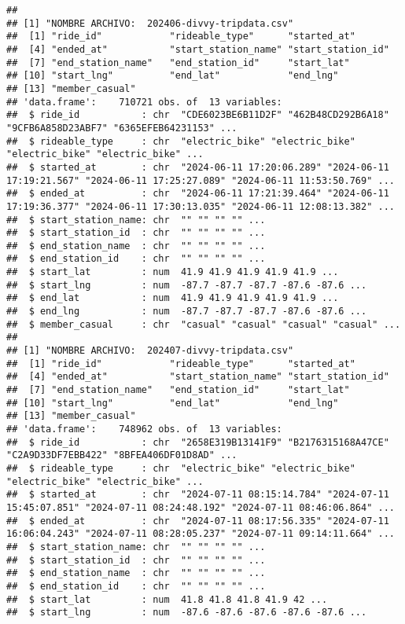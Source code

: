 \documentclass[
]{article}
\begin{document}
\begin{verbatim}
## 
## [1] "NOMBRE ARCHIVO:  202406-divvy-tripdata.csv"
##  [1] "ride_id"            "rideable_type"      "started_at"        
##  [4] "ended_at"           "start_station_name" "start_station_id"  
##  [7] "end_station_name"   "end_station_id"     "start_lat"         
## [10] "start_lng"          "end_lat"            "end_lng"           
## [13] "member_casual"     
## 'data.frame':    710721 obs. of  13 variables:
##  $ ride_id           : chr  "CDE6023BE6B11D2F" "462B48CD292B6A18" "9CFB6A858D23ABF7" "6365EFEB64231153" ...
##  $ rideable_type     : chr  "electric_bike" "electric_bike" "electric_bike" "electric_bike" ...
##  $ started_at        : chr  "2024-06-11 17:20:06.289" "2024-06-11 17:19:21.567" "2024-06-11 17:25:27.089" "2024-06-11 11:53:50.769" ...
##  $ ended_at          : chr  "2024-06-11 17:21:39.464" "2024-06-11 17:19:36.377" "2024-06-11 17:30:13.035" "2024-06-11 12:08:13.382" ...
##  $ start_station_name: chr  "" "" "" "" ...
##  $ start_station_id  : chr  "" "" "" "" ...
##  $ end_station_name  : chr  "" "" "" "" ...
##  $ end_station_id    : chr  "" "" "" "" ...
##  $ start_lat         : num  41.9 41.9 41.9 41.9 41.9 ...
##  $ start_lng         : num  -87.7 -87.7 -87.7 -87.6 -87.6 ...
##  $ end_lat           : num  41.9 41.9 41.9 41.9 41.9 ...
##  $ end_lng           : num  -87.7 -87.7 -87.7 -87.6 -87.6 ...
##  $ member_casual     : chr  "casual" "casual" "casual" "casual" ...
## 
## [1] "NOMBRE ARCHIVO:  202407-divvy-tripdata.csv"
##  [1] "ride_id"            "rideable_type"      "started_at"        
##  [4] "ended_at"           "start_station_name" "start_station_id"  
##  [7] "end_station_name"   "end_station_id"     "start_lat"         
## [10] "start_lng"          "end_lat"            "end_lng"           
## [13] "member_casual"     
## 'data.frame':    748962 obs. of  13 variables:
##  $ ride_id           : chr  "2658E319B13141F9" "B2176315168A47CE" "C2A9D33DF7EBB422" "8BFEA406DF01D8AD" ...
##  $ rideable_type     : chr  "electric_bike" "electric_bike" "electric_bike" "electric_bike" ...
##  $ started_at        : chr  "2024-07-11 08:15:14.784" "2024-07-11 15:45:07.851" "2024-07-11 08:24:48.192" "2024-07-11 08:46:06.864" ...
##  $ ended_at          : chr  "2024-07-11 08:17:56.335" "2024-07-11 16:06:04.243" "2024-07-11 08:28:05.237" "2024-07-11 09:14:11.664" ...
##  $ start_station_name: chr  "" "" "" "" ...
##  $ start_station_id  : chr  "" "" "" "" ...
##  $ end_station_name  : chr  "" "" "" "" ...
##  $ end_station_id    : chr  "" "" "" "" ...
##  $ start_lat         : num  41.8 41.8 41.8 41.9 42 ...
##  $ start_lng         : num  -87.6 -87.6 -87.6 -87.6 -87.6 ...

\end{verbatim}
\end{document}
